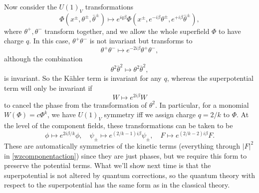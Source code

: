 Now consider the $U(1)_V$ transformations
\begin{equation}
    \Phi(x^\pm, \theta^\pm, \bar \theta^\pm)\mapsto e^{iq\beta} \Phi(x^\pm, e^{- i \beta}\theta^\pm, e^{+ i \beta}\bar \theta^\pm),
\end{equation}
where $\theta^+,\theta^-$ transform together, and we allow the whole superfield $\Phi$ to have charge $q$. In this case, $\theta^+ \theta^-$ is not invariant but transforms to
\begin{equation}
    \theta^+ \theta^- \mapsto e^{-2i\beta} \theta^+ \theta^-,
\end{equation}
although the combination
\begin{equation}
    \theta^2 \bar \theta^2 \mapsto \theta^2 \bar \theta^2,
\end{equation}
is invariant. So the K\"ahler term is invariant for any $q$, whereas the superpotential term will only be invariant if
\begin{equation}
    W\mapsto e^{2i\beta} W
\end{equation}
to cancel the phase from the transformation of $\theta^2$. In particular, for a monomial $W(\Phi)=c\Phi^k$, we have $U(1)_V$ symmetry iff we assign charge $q=2/k$ to $\Phi$. At the level of the component fields, these transformations can be taken to be
\begin{equation}
    \phi \mapsto e^{2i\beta /k} \phi,\quad \psi_\pm \mapsto e^{(2/k -1)i\beta} \psi_\pm, \quad F\mapsto e^{(2/k-2) i\beta}F.
\end{equation}
These are automatically symmetries of the kinetic terms (everything through $|F|^2$ in \ref{wzcomponentaction}) since they are just phases, but we require this form to preserve the potential terms. What we'll show next time is that the superpotential is not altered by quantum corrections, so the quantum theory with respect to the superpotential has the same form as in the classical theory.
